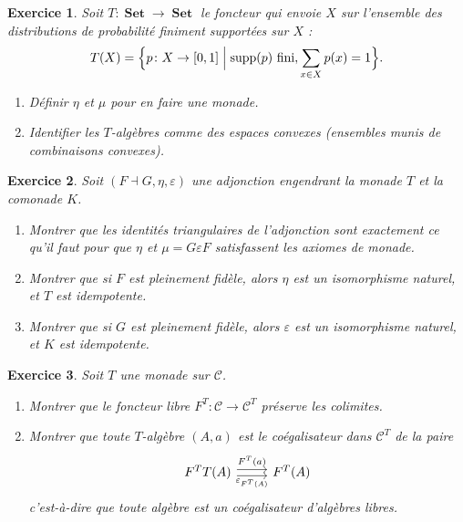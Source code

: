\documentclass[a4paper,12pt]{book}
\DeclareMathOperator{\Set}{\mathbf{Set}}
\newtheorem{exercice}{Exercice}[chapter]
\begin{document}
\begin{exercice}\label{exo:monade-distribution}
Soit $T \colon \Set \to \Set$ le foncteur qui envoie $X$ sur l'ensemble
des distributions de probabilité finiment supportées sur $X$ :
\[
    T(X) = \Bigl\{ p \colon X \to [0,1] \;\Big|\;
    \mathrm{supp}(p) \text{ fini}, \sum_{x \in X} p(x) = 1 \Bigr\}.
\]
\begin{enumerate}[label=(\alph*)]
\item Définir $\eta$ et $\mu$ pour en faire une monade.
\item Identifier les $T$-algèbres comme des espaces convexes
    (ensembles munis de combinaisons convexes).
\end{enumerate}
\end{exercice}

\begin{exercice}\label{exo:adjonction-monade-aller-retour}
Soit $(F \dashv G, \eta, \varepsilon)$ une adjonction engendrant
la monade $T$ et la comonade $K$.
\begin{enumerate}[label=(\alph*)]
\item Montrer que les identités triangulaires de l'adjonction sont
    exactement ce qu'il faut pour que $\eta$ et $\mu = G\varepsilon F$
    satisfassent les axiomes de monade.
\item Montrer que si $F$ est pleinement fidèle, alors
    $\eta$ est un isomorphisme naturel, et $T$ est idempotente.
\item Montrer que si $G$ est pleinement fidèle, alors
    $\varepsilon$ est un isomorphisme naturel, et $K$ est idempotente.
\end{enumerate}
\end{exercice}

\begin{exercice}\label{exo:algebres-libres-colimites}
Soit $T$ une monade sur $\mathcal{C}$.
\begin{enumerate}[label=(\alph*)]
\item Montrer que le foncteur libre $F^T \colon \mathcal{C} \to \mathcal{C}^T$
    préserve les colimites.
\item Montrer que toute $T$-algèbre $(A, a)$ est le coégalisateur dans
    $\mathcal{C}^T$ de la paire
    \[
    \begin{tikzcd}
    F^T T(A) \arrow[r, shift left, "F^T(a)"]
    \arrow[r, shift right, "\varepsilon_{F^T(A)}"'] & F^T(A)
    \end{tikzcd}
    \]
    c'est-à-dire que toute algèbre est un coégalisateur d'algèbres libres.
\end{enumerate}
\end{exercice}
\end{document}
